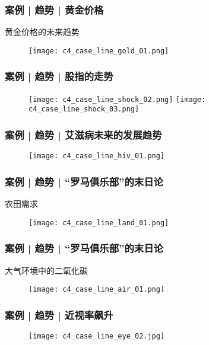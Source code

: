 \begin{frame}
  \frametitle{案例 | 趋势 | 黄金价格}
  \begin{block}{黄金价格的未来趋势}
    \begin{figure}
      \centering
      \texttt{[image: c4\_case\_line\_gold\_01.png]}
    \end{figure}
  \end{block}
\end{frame}

\begin{frame}
  \frametitle{案例 | 趋势 | 股指的走势}
  \begin{figure}
    \centering
    \texttt{[image: c4\_case\_line\_shock\_02.png]}\quad
    \texttt{[image: c4\_case\_line\_shock\_03.png]}
  \end{figure}
\end{frame}

\begin{frame}
  \frametitle{案例 | 趋势 | 艾滋病未来的发展趋势}
  \begin{figure}
    \centering
    \texttt{[image: c4\_case\_line\_hiv\_01.png]}
  \end{figure}
\end{frame}

\begin{frame}
  \frametitle{案例 | 趋势 | “罗马俱乐部”的末日论}
  \begin{block}{农田需求}
    \begin{figure}
      \centering
      \texttt{[image: c4\_case\_line\_land\_01.png]}
    \end{figure}
  \end{block}
\end{frame}

\begin{frame}
  \frametitle{案例 | 趋势 | “罗马俱乐部”的末日论}
  \begin{block}{大气环境中的二氧化碳}
    \begin{figure}
      \centering
      \texttt{[image: c4\_case\_line\_air\_01.png]}
    \end{figure}
  \end{block}
\end{frame}

\begin{frame}
  \frametitle{案例 | 趋势 | 近视率飙升}
    \begin{figure}
      \centering
      \texttt{[image: c4\_case\_line\_eye\_02.jpg]}
    \end{figure}
\end{frame}

